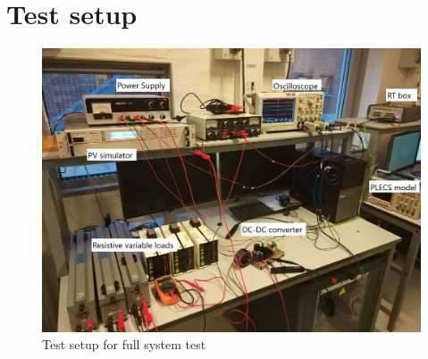 \chapter{Test setup}

\begin{figure}[H]
	\begin{center}
		\includegraphics[width=1\textwidth]{../Pictures/P1/Appendix/testsetup.png}
		\caption{Test setup for full system test}
		\label{testsetup}
	\end{center}	
\end{figure}